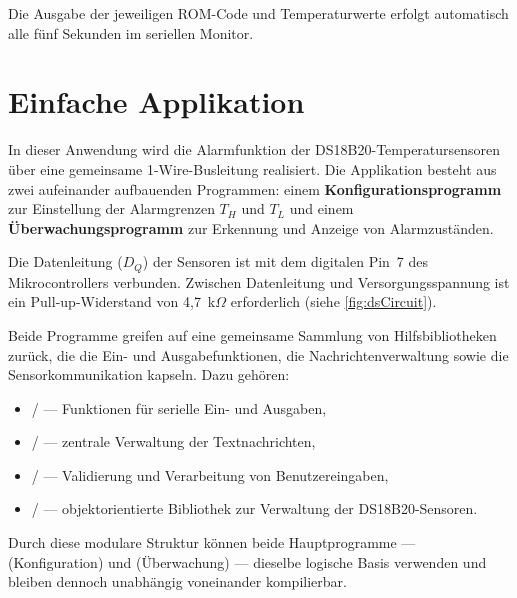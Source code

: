	Die Ausgabe der jeweiligen ROM-Code und Temperaturwerte erfolgt automatisch alle fünf Sekunden im seriellen Monitor.
	
	
	{
	}
	
\section{Einfache Applikation}
	In dieser Anwendung wird die Alarmfunktion der DS18B20-Temperatursensoren über eine gemeinsame 1-Wire-Busleitung realisiert.  
	Die Applikation besteht aus zwei aufeinander aufbauenden Programmen:  
	einem \textbf{Konfigurationsprogramm} zur Einstellung der Alarmgrenzen $T_H$ und $T_L$  
	und einem \textbf{Überwachungsprogramm} zur Erkennung und Anzeige von Alarmzuständen.  
	
	Die Datenleitung ($D_Q$) der Sensoren ist mit dem digitalen Pin~7 des Mikrocontrollers verbunden.  
	Zwischen Datenleitung und Versorgungsspannung ist ein Pull-up-Widerstand von 4{,}7~k$\Omega$ erforderlich (siehe \autoref{fig:dsCircuit}).  
	
	Beide Programme greifen auf eine gemeinsame Sammlung von Hilfsbibliotheken zurück, die die Ein- und Ausgabefunktionen, die Nachrichtenverwaltung sowie die Sensorkommunikation kapseln. Dazu gehören:  
	
	\begin{itemize}
		\item {} /  — Funktionen für serielle Ein- und Ausgaben,  
		\item {} /  — zentrale Verwaltung der Textnachrichten,  
		\item {} /  — Validierung und Verarbeitung von Benutzereingaben,  
		\item {} /  — objektorientierte Bibliothek zur Verwaltung der DS18B20-Sensoren.
	\end{itemize}
	
	Durch diese modulare Struktur können beide Hauptprogramme —  (Konfiguration)  
	und  (Überwachung) — dieselbe logische Basis verwenden und bleiben dennoch unabhängig voneinander kompilierbar.
	
	{
	}
	
